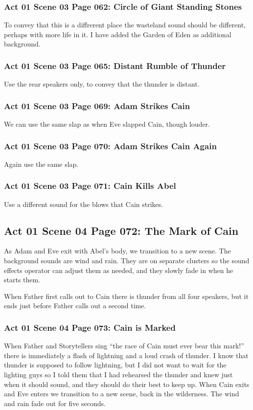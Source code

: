 \documentclass[letterpaper,twoside]{article}
\begin{document}
\subsubsection{Act 01 Scene 03 Page 062: Circle of Giant Standing Stones}
To convey that this is a diffrerent place the wasteland sound
should be different, perhaps with more life in it.  I have added
the Garden of Eden as additional background.

\subsubsection{Act 01 Scene 03 Page 065: Distant Rumble of Thunder}
Use the rear speakers only, to convey that the thunder is distant.

\subsubsection{Act 01 Scene 03 Page 069: Adam Strikes Cain}
We can use the same slap as when Eve slapped Cain, though louder.

\subsubsection{Act 01 Scene 03 Page 070: Adam Strikes Cain Again}
Again use the same slap.

\subsubsection{Act 01 Scene 03 Page 071: Cain Kills Abel}
Use a different sound for the blows that Cain strikes.

\subsection{Act 01 Scene 04 Page 072: The Mark of Cain}
As Adam and Eve exit with Abel's body, we transition to a new
scene.  The background sounds are wind and rain.  They are
on separate clusters so the sound effects operator can adjust
them as needed, and they slowly fade in when he starts them.

When Father first calls out to Cain there is thunder from
all four speakers, but it ends just before Father calls out
a second time.

\subsubsection{Act 01 Scene 04 Page 073: Cain is Marked}
When Father and Storytellers sing
``the race of Cain must ever bear this mark!''
there is immediately a flash of lightning and a loud crash of thunder.
I know that thunder is supposed to follow lightning, but I did not
want to wait for the lighting guys so I told them that I had rehearsed
the thunder and knew just when it should sound, and they should do
their best to keep up.
When Cain exits and Eve enters we transition to a new scene,
back in the wilderness.  The wind and rain fade out for five seconds.
\end{document}
